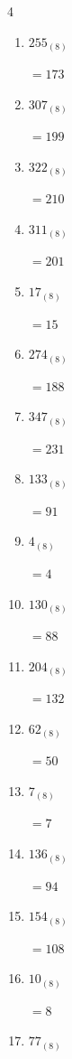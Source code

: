 \begin{multicols}{4}
\begin{enumerate}
  \item $255_{(8)}$

        $=173$

  \item $307_{(8)}$

        $=199$

  \item $322_{(8)}$

        $=210$

  \item $311_{(8)}$

        $=201$

  \item $17_{(8)}$

        $=15$

  \item $274_{(8)}$

        $=188$

  \item $347_{(8)}$

        $=231$

  \item $133_{(8)}$

        $=91$

\columnbreak %

  \item $4_{(8)}$

        $=4$

  \item $130_{(8)}$

        $=88$

  \item $204_{(8)}$

        $=132$

  \item $62_{(8)}$

        $=50$

  \item $7_{(8)}$

        $=7$

  \item $136_{(8)}$

        $=94$

  \item $154_{(8)}$

        $=108$

  \item $10_{(8)}$

        $=8$

  \item $77_{(8)}$


\end{enumerate}
\end{multicols}
